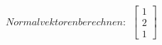 \documentclass[preview]{standalone}
\begin{document}
\begin{center}
$Normalvektoren berechnen: \begin{align} \begin{bmatrix} 1 \\ 2 \\ 1 \end{bmatrix} \end{align}$
\end{center}
\end{document}
